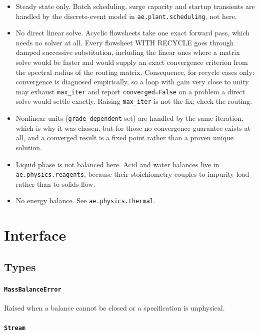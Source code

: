 \documentclass[10pt,a4paper,twoside]{report}
\begin{document}
\begin{itemize}
\item Steady state only. Batch scheduling, surge capacity and startup transients are handled by the discrete-event model in \texttt{ae.plant.scheduling}, not here.
\item No direct linear solve. Acyclic flowsheets take one exact forward pass, which needs no solver at all. Every flowsheet WITH RECYCLE goes through damped successive substitution, including the linear ones where a matrix solve would be faster and would supply an exact convergence criterion from the spectral radius of the routing matrix. Consequence, for recycle cases only: convergence is diagnosed empirically, so a loop with gain very close to unity may exhaust \texttt{max\_iter} and report \texttt{converged=False} on a problem a direct solve would settle exactly. Raising \texttt{max\_iter} is not the fix; check the routing.
\item Nonlinear units (\texttt{grade\_dependent} set) are handled by the same iteration, which is why it was chosen, but for those no convergence guarantee exists at all, and a converged result is a fixed point rather than a proven unique solution.
\item Liquid phase is not balanced here. Acid and water balances live in \texttt{ae.physics.reagents}, because their stoichiometry couples to impurity load rather than to solids flow.
\item No energy balance. See \texttt{ae.physics.thermal}.
\end{itemize}

\section{Interface}

\subsection*{Types}

\paragraph{\texttt{MassBalanceError}}

Raised when a balance cannot be closed or a specification is unphysical.

\paragraph{\texttt{Stream}}
\end{document}
